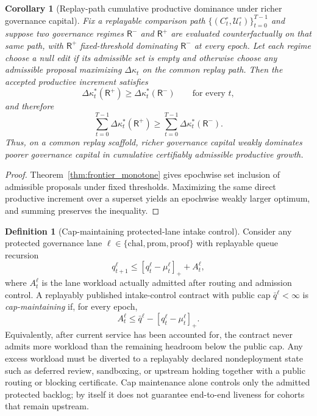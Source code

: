 \documentclass[11pt]{article}
\newtheorem{corollary}[theorem]{Corollary}
\theoremstyle{definition}
\newtheorem{definition}[theorem]{Definition}
\newcommand{\1}{\mathbf{1}}
\begin{document}
\begin{corollary}[Replay-path cumulative productive dominance under richer governance capital]\label{cor:frontier_cumulative}
Fix a replayable comparison path $\{(C_t^{\circ},\mathcal U_t^{\circ})\}_{t=0}^{T-1}$ and suppose two governance regimes $\mathsf R^-$ and $\mathsf R^+$ are evaluated counterfactually on that same path, with $\mathsf R^+$ fixed-threshold dominating $\mathsf R^-$ at every epoch. Let each regime choose a null edit if its admissible set is empty and otherwise choose any admissible proposal maximizing $\Delta\kappa_t$ on the common replay path. Then the accepted productive increment satisfies
\[
\Delta\kappa_t^{\ast}(\mathsf R^+)\ge \Delta\kappa_t^{\ast}(\mathsf R^-)\qquad\text{for every }t,
\]
and therefore
\[
\sum_{t=0}^{T-1}\Delta\kappa_t^{\ast}(\mathsf R^+)\ge\sum_{t=0}^{T-1}\Delta\kappa_t^{\ast}(\mathsf R^-).
\]
Thus, on a common replay scaffold, richer governance capital weakly dominates poorer governance capital in cumulative \emph{certifiably admissible} productive growth.
\end{corollary}

\begin{proof}
Theorem~\ref{thm:frontier_monotone} gives epochwise set inclusion of admissible proposals under fixed thresholds. Maximizing the same direct productive increment over a superset yields an epochwise weakly larger optimum, and summing preserves the inequality.
\end{proof}

\begin{definition}[Cap-maintaining protected-lane intake control]\label{def:cap_maintain}
Consider any protected governance lane $\ell\in\{\mathrm{chal},\mathrm{prom},\mathrm{proof}\}$ with replayable queue recursion
\[
q_{t+1}^{\ell}\le [q_t^{\ell}-\mu_t^{\ell}]_+ + A_t^{\ell},
\]
where $A_t^{\ell}$ is the lane workload actually admitted after routing and admission control. A replayably published intake-control contract with public cap $\bar q^{\ell}<\infty$ is \emph{cap-maintaining} if, for every epoch,
\[
A_t^{\ell}\le \bar q^{\ell}-[q_t^{\ell}-\mu_t^{\ell}]_+.
\]
Equivalently, after current service has been accounted for, the contract never admits more workload than the remaining headroom below the public cap. Any excess workload must be diverted to a replayably declared nondeployment state such as deferred review, sandboxing, or upstream holding together with a public routing or blocking certificate. Cap maintenance alone controls only the admitted protected backlog; by itself it does not guarantee end-to-end liveness for cohorts that remain upstream.
\end{definition}
\end{document}
